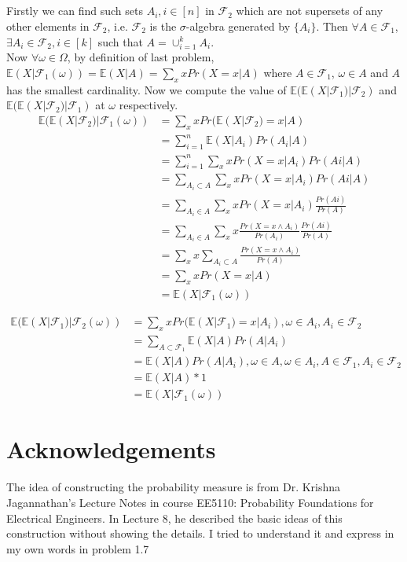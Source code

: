 \documentclass[12pt,letterpaper]{article}
\begin{document}
\subsection{}
Firstly we can find such sets $A_i, i\in [n]$ in $\mathcal{F}_2$ which are not supersets of any other elements in $\mathcal{F}_2$, i.e. $\mathcal{F}_2$ is the $\sigma$-algebra generated by $\{A_i\}$. Then $\forall A\in\mathcal{F}_1$, $\exists A_i\in\mathcal{F}_2,i\in [k]$ such that $A=\cup_{i=1}^{k}A_i$.\\
Now $\forall\omega\in\Omega$, by definition of last problem, $\mathbb{E}(X|\mathcal{F}_1(\omega))=\mathbb{E}(X|A)=\sum_{x}xPr(X=x|A)$ where $A\in\mathcal{F}_1$, $\omega\in A$ and $A$ has the smallest cardinality. Now we compute the value of $\mathbb{E}(\mathbb{E}(X|\mathcal{F}_1)|\mathcal{F}_2)$ and $\mathbb{E}(\mathbb{E}(X|\mathcal{F}_2)|\mathcal{F}_1)$ at $\omega$ respectively.\\
\begin{align}
\mathbb{E}(\mathbb{E}(X|\mathcal{F}_2)|\mathcal{F}_1(\omega))&=\sum_{x}xPr(\mathbb{E}(X|\mathcal{F}_2)=x|A)\\
&=\sum_{i=1}^{n}\mathbb{E}(X|A_i)Pr(A_i|A)\\
&=\sum_{i=1}^{n}\sum_{x}xPr(X=x|A_i)Pr(Ai|A)\\
&=\sum_{A_i\subset A}\sum_{x}xPr(X=x|A_i)Pr(Ai|A)\\
&=\sum_{A_i\in A}\sum_{x}xPr(X=x|A_i)\frac{Pr(Ai)}{Pr(A)}\\
&=\sum_{A_i\in A}\sum_{x}x\frac{Pr(X=x\wedge A_i)}{Pr(A_i)}\frac{Pr(Ai)}{Pr(A)}\\
&=\sum_xx\sum_{A_i\subset A}\frac{Pr(X=x\wedge A_i)}{Pr(A)}\\
&=\sum_xxPr(X=x|A)\\
&=\mathbb{E}(X|\mathcal{F}_1(\omega))
\end{align}

\begin{align}
\mathbb{E}(\mathbb{E}(X|\mathcal{F}_1)|\mathcal{F}_2(\omega))&=\sum_{x}xPr(\mathbb{E}(X|\mathcal{F}_1)=x|A_i), \omega\in A_i, A_i\in\mathcal{F}_2\\
&=\sum_{A\subset\mathcal{F}_1}\mathbb{E}(X|A)Pr(A|A_i)\\
&=\mathbb{E}(X|A)Pr(A|A_i), \omega\in A, \omega\in A_i, A\in\mathcal{F}_1, A_i\in\mathcal{F}_2\\
&=\mathbb{E}(X|A)*1\\
&=\mathbb{E}(X|\mathcal{F}_1(\omega))
\end{align}

\section*{Acknowledgements}
The idea of constructing the probability measure is from Dr. Krishna Jagannathan's Lecture Notes in course EE5110: Probability Foundations for Electrical Engineers. In Lecture 8, he described the basic ideas of this construction without showing the details. I tried to 
understand it and express in my own words in problem 1.7
\end{document}
